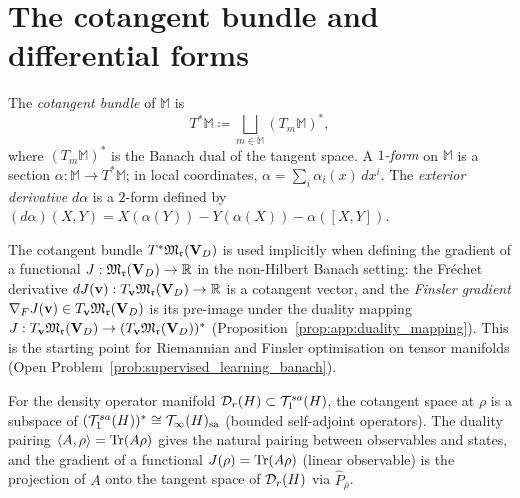 \section{The cotangent bundle and differential forms}
\label{app:manifolds:cotangent}

The \emph{cotangent bundle} of $\mathbb{M}$ is
\begin{equation}
    T^*\mathbb{M} \coloneqq \bigsqcup_{m \in \mathbb{M}} (T_m\mathbb{M})^*,
\end{equation}
where $(T_m\mathbb{M})^*$ is the Banach dual of the tangent space.
A \emph{$1$-form} on $\mathbb{M}$ is a section $\alpha: \mathbb{M} \to
T^*\mathbb{M}$; in local coordinates, $\alpha = \sum_i \alpha_i(x)\,dx^i$.
The \emph{exterior derivative} $d\alpha$ is a $2$-form defined by
$(d\alpha)(X,Y) = X(\alpha(Y)) - Y(\alpha(X)) - \alpha([X,Y])$.

\begin{remark}
\label{rem:app:cotangent_lind}
The cotangent bundle $T^*\mathfrak{M}_{\mathfrak{r}}(\mathbf{V}_D)$ is used implicitly when
defining the gradient of a functional $J: \mathfrak{M}_{\mathfrak{r}}(\mathbf{V}_D) \to \mathbb{R}$
in the non-Hilbert Banach setting: the Fréchet derivative
$dJ(\mathbf{v}): T_{\mathbf{v}}\mathfrak{M}_{\mathfrak{r}}(\mathbf{V}_D) \to \mathbb{R}$ is a cotangent vector,
and the \emph{Finsler gradient} $\nabla_F J(\mathbf{v}) \in
T_{\mathbf{v}}\mathfrak{M}_{\mathfrak{r}}(\mathbf{V}_D)$ is its pre-image under the duality mapping
$J: T_{\mathbf{v}}\mathfrak{M}_{\mathfrak{r}}(\mathbf{V}_D) \to (T_{\mathbf{v}}\mathfrak{M}_{\mathfrak{r}}(\mathbf{V}_D))^*$
(Proposition~\ref{prop:app:duality_mapping}). This is the starting
point for Riemannian and Finsler optimisation on tensor manifolds
(Open Problem~\ref{prob:supervised_learning_banach}).

For the density operator manifold $\mathcal{D}_{r}(H) \subset \mathcal{T}_{1}^{sa}(H)$,
the cotangent space at $\rho$ is a subspace of $(\mathcal{T}_{1}^{sa}(H))^* \cong
\mathcal{T}_{\infty}(H)_{\mathrm{sa}}$ (bounded self-adjoint operators). The
duality pairing $\langle A, \rho\rangle = \mathrm{Tr}(A\rho)$ gives the natural
pairing between observables and states, and the gradient of a functional
$J(\rho) = \mathrm{Tr}(A\rho)$ (linear observable) is the projection of $A$
onto the tangent space of $\mathcal{D}_{r}(H)$ via $\hat{P}_\rho$.
\end{remark}
